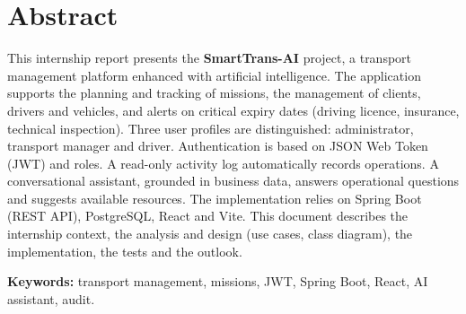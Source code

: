 \chapter*{Abstract}

This internship report presents the \textbf{SmartTrans-AI} project, a transport management platform enhanced with artificial intelligence. The application supports the planning and tracking of missions, the management of clients, drivers and vehicles, and alerts on critical expiry dates (driving licence, insurance, technical inspection). Three user profiles are distinguished: administrator, transport manager and driver. Authentication is based on JSON Web Token (JWT) and roles. A read-only activity log automatically records operations. A conversational assistant, grounded in business data, answers operational questions and suggests available resources. The implementation relies on Spring Boot (REST API), PostgreSQL, React and Vite. This document describes the internship context, the analysis and design (use cases, class diagram), the implementation, the tests and the outlook.

\vspace{0.8em}
\noindent\textbf{Keywords:} transport management, missions, JWT, Spring Boot, React, AI assistant, audit.
